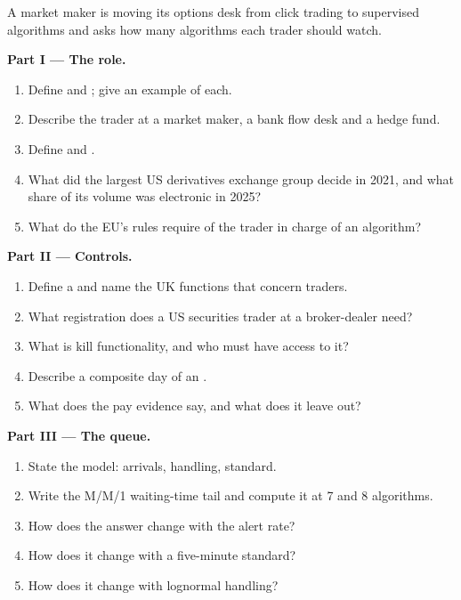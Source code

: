 \begin{problem}\label{pb:in:trader:1}
A market maker is moving its options desk from click trading to supervised algorithms and asks how many algorithms each
trader should watch.

\medskip\noindent\textbf{Part I --- The role.}
\begin{enumerate}
\item Define  and ; give an example of each.
\item Describe the trader at a market maker, a bank flow desk and a hedge fund.
\item Define  and .
\item What did the largest US derivatives exchange group decide in 2021, and what share of its volume was electronic in
2025?
\item What do the EU's rules require of the trader in charge of an algorithm?
\end{enumerate}

\medskip\noindent\textbf{Part II --- Controls.}
\begin{enumerate}[resume]
\item Define a  and name the UK functions that concern traders.
\item What registration does a US securities trader at a broker-dealer need?
\item What is kill functionality, and who must have access to it?
\item Describe a composite day of an .
\item What does the pay evidence say, and what does it leave out?
\end{enumerate}

\medskip\noindent\textbf{Part III --- The queue.}
\begin{enumerate}[resume]
\item State the model: arrivals, handling, standard.
\item Write the M/M/1 waiting-time tail and compute it at 7 and 8 algorithms.
\item How does the answer change with the alert rate?
\item How does it change with a five-minute standard?
\item How does it change with lognormal handling?
\end{enumerate}


\end{problem}

